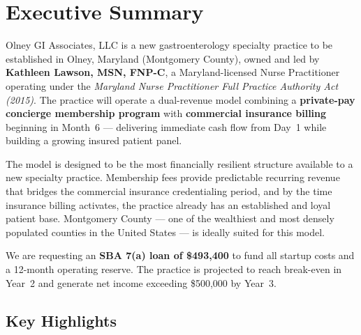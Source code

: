 \documentclass[11pt,letterpaper]{article}
\newcommand{\ownername}{Kathleen Lawson}
\newcommand{\ownercredentials}{MSN, FNP-C}
\begin{document}
\newpage

\renewcommand{\contentsname}{\color{navy}Table of Contents}
\tableofcontents
\newpage

\section{Executive Summary}

Olney GI Associates, LLC is a new gastroenterology specialty practice to be established in Olney, Maryland (Montgomery County), owned and led by \textbf{\ownername, \ownercredentials}, a Maryland-licensed Nurse Practitioner operating under the \textit{Maryland Nurse Practitioner Full Practice Authority Act (2015)}. The practice will operate a dual-revenue model combining a \textbf{private-pay concierge membership program} with \textbf{commercial insurance billing} beginning in Month~6 --- delivering immediate cash flow from Day~1 while building a growing insured patient panel.

\medskip
The model is designed to be the most financially resilient structure available to a new specialty practice. Membership fees provide predictable recurring revenue that bridges the commercial insurance credentialing period, and by the time insurance billing activates, the practice already has an established and loyal patient base. Montgomery County --- one of the wealthiest and most densely populated counties in the United States --- is ideally suited for this model.

\medskip
We are requesting an \textbf{SBA 7(a) loan of \$493,400} to fund all startup costs and a 12-month operating reserve. The practice is projected to reach break-even in Year~2 and generate net income exceeding \$500,000 by Year~3.

\subsection*{Key Highlights}
\end{document}
